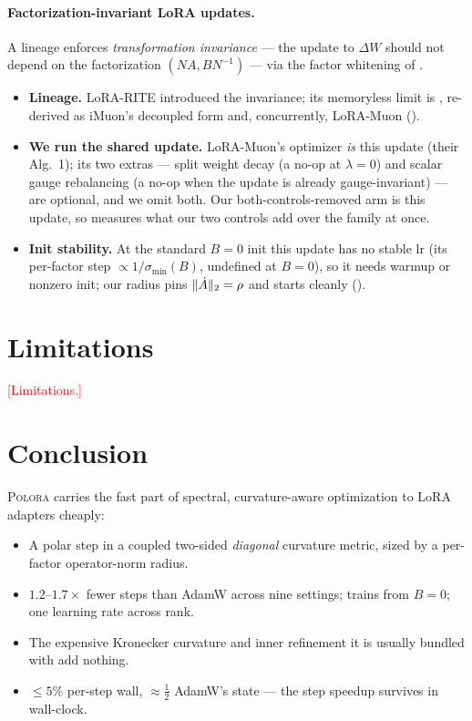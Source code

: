 \documentclass[11pt]{article}
\DeclarePairedDelimiter{\norm}{\lVert}{\rVert}
\newcommand{\DW}{\Delta W}
\newcommand{\methodname}{\textsc{Polora}\xspace}
\newcommand{\PLACEHOLDER}[1]{\textcolor{red}{[#1]}}
\theoremstyle{plain}
\theoremstyle{definition}
\theoremstyle{remark}
\begin{document}
\paragraph{Factorization-invariant LoRA updates.} A lineage enforces \emph{transformation invariance} --- the update to $\DW$ should not depend on the factorization $(NA,BN^{-1})$ --- via the factor whitening of .
\begin{itemize}[leftmargin=1.5em,itemsep=1pt,topsep=2pt]
  \item \textbf{Lineage.} LoRA-RITE \cite{lorarite} introduced the invariance; its memoryless limit is , re-derived as iMuon's decoupled form \cite{imuon} and, concurrently, LoRA-Muon \cite{loramuon} ().
  \item \textbf{We run the shared update.} LoRA-Muon's optimizer \emph{is} this update (their Alg.~1); its two extras --- split weight decay (a no-op at $\lambda{=}0$) and scalar gauge rebalancing (a no-op when the update is already gauge-invariant) --- are optional, and we omit both. Our both-controls-removed arm is this update, so  measures what our two controls add over the family at once.
  \item \textbf{Init stability.} At the standard $B{=}0$ init this update has no stable lr (its per-factor step $\propto 1/\sigma_{\min}(B)$, undefined at $B{=}0$), so it needs warmup or nonzero init; our radius pins $\norm{\dot A}_2=\rho$ and starts cleanly ().
\end{itemize}


\section{Limitations}
\label{sec:limitations}
\PLACEHOLDER{Limitations.}

\section{Conclusion}
\label{sec:conclusion}
\methodname{} carries the fast part of spectral, curvature-aware optimization to
LoRA adapters cheaply:
\begin{itemize}[leftmargin=1.5em,itemsep=2pt,topsep=2pt]
  \item A polar step in a coupled two-sided \emph{diagonal} curvature metric, sized by a per-factor operator-norm radius.
  \item $1.2$--$1.7\times$ fewer steps than AdamW across nine settings; trains from $B{=}0$; one learning rate across rank.
  \item The expensive Kronecker curvature and inner refinement it is usually bundled with add nothing.
  \item $\le 5\%$ per-step wall, ${\approx}\tfrac12$ AdamW's state --- the step speedup survives in wall-clock.
\end{itemize}
\end{document}
